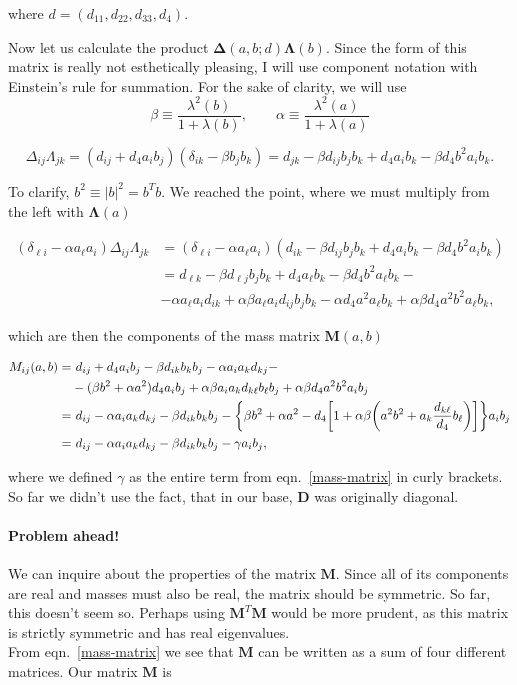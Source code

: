 \documentclass[12pt, a4paper]{article}
\renewcommand{\ni}{
	\noindent
}
\newcommand{\M}{
	\ensuremath{\mathbf{M}}
}
\renewcommand{\L}{
	\ensuremath{\mathbf{\Lambda}}
}
\newcommand{\D}{
	\ensuremath{\mathbf{D}}
}
\newcommand{\De}{
	\ensuremath{\mathbf{\Delta}}
}
\begin{document}
\ni where $d = (d_{11}, d_{22}, d_{33}, d_4)$.

Now let us calculate the product $\De (a,b;d) \L(b)$. Since the form of this matrix is really not
esthetically pleasing, I will use component notation with Einstein's rule for summation. For the sake of clarity, we will
use
\[
	\beta \equiv \frac{\lambda^2(b)}{1 + \lambda(b)},\qquad \alpha \equiv \frac{\lambda^2(a)}{1 + \lambda(a)}
\]

\[
	\Delta_{ij}\Lambda_{jk} = (d_{ij} + d_4 a_i b_j) (\delta_{ik} - \beta b_j b_k) = d_{jk} - \beta d_{ij}b_j b_k +
		d_4 a_i b_k - \beta d_4 b^2 a_i b_k.
\]

\ni To clarify, $b^2 \equiv |b|^2 = b^T b$. We reached the point, where we must multiply from the left with $\L(a)$

\begin{align*}
	(\delta_{\ell i} - \alpha a_\ell a_i) \Delta_{ij}\Lambda_{jk} &= (\delta_{\ell i} - \alpha a_\ell a_i)
		(d_{ik} - \beta d_{ij}b_j b_k + d_4 a_i b_k - \beta d_4 b^2 a_i b_k) \\
	&= d_{\ell k} - \beta d_{\ell j} b_j b_k + d_4 a_\ell b_k - \beta d_4 b^2 a_\ell b_k -\\
	&- \alpha a_\ell a_i d_{ik} + \alpha\beta a_\ell a_i d_{ij} b_j b_k - \alpha d_4 a^2 a_\ell b_k +
		\alpha\beta d_4 a^2 b^2 a_\ell b_k,
\end{align*}

\ni which are then the components of the mass matrix $\M (a, b)$

\begin{align}
	M_{ij} (a, b) =&\ d_{ij} + d_4 a_i b_j - \beta d_{ik} b_k b_j - \alpha a_i a_k d_{kj} - \notag \\
	&-(\beta b^2 + \alpha a^2) d_4 a_i b_j + \alpha \beta a_i a_k d_{k\ell} b_\ell b_j +
		\alpha \beta d_4 a^2 b^2 a_i b_j \notag \\
	=&\ d_{ij} - \alpha a_i a_k d_{kj} - \beta d_{ik} b_k b_j - \bigg\{\beta b^2 + \alpha a^2 - d_4\bigg[1 +
		\alpha\beta\bigg(a^2 b^2 + a_k\frac{d_{k\ell}}{d_4}b_\ell\bigg)\bigg]\bigg\} a_ib_j \notag \\
	=&\ d_{ij} - \alpha a_i a_k d_{kj} - \beta d_{ik} b_k b_j -\gamma a_i b_j, 
	\label{mass-matrix}
\end{align}

\ni where we defined $\gamma$ as the entire term from eqn.~\eqref{mass-matrix} in curly brackets. So far we didn't use
the fact, that in our base, $\D$ was originally diagonal.

\paragraph{Problem ahead!}
We can inquire about the properties of the matrix $\M$. Since all of its components are real and masses
must also be real, the matrix should be symmetric. So far, this doesn't seem so. Perhaps using $\M^T \M$ would be more
prudent, as this matrix is strictly symmetric and has real eigenvalues.
\\[0.5cm]
From eqn.~\eqref{mass-matrix} we see that $\M$ can be written as a sum of four different matrices. Our matrix $\M$ is
\end{document}

